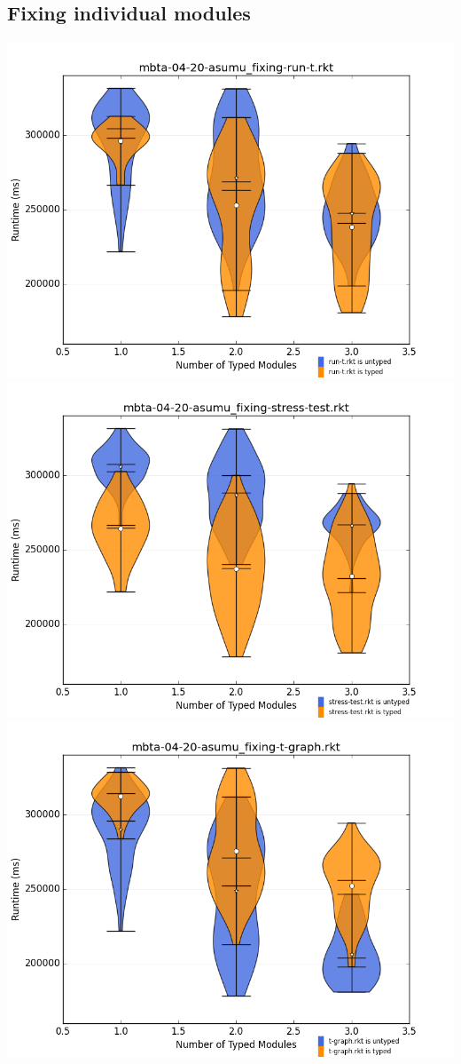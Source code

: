\documentclass{article}
\begin{document}
\subsection{Fixing individual modules}
\includegraphics[width=\textwidth]{mbta-04-20-asumu_fixing-run-t.rkt-dv.png}
\includegraphics[width=\textwidth]{mbta-04-20-asumu_fixing-stress-test.rkt-dv.png}
\includegraphics[width=\textwidth]{mbta-04-20-asumu_fixing-t-graph.rkt-dv.png}
\end{document}

